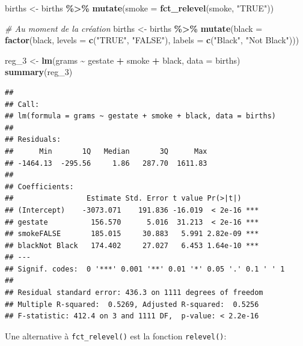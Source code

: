 \documentclass[
  11pt,
]{book}
\newenvironment{Shaded}{\begin{snugshade}}{\end{snugshade}}
\newcommand{\CommentTok}[1]{\textcolor[rgb]{0.56,0.35,0.01}{\textit{#1}}}
\newcommand{\DataTypeTok}[1]{\textcolor[rgb]{0.13,0.29,0.53}{#1}}
\newcommand{\DecValTok}[1]{\textcolor[rgb]{0.00,0.00,0.81}{#1}}
\newcommand{\KeywordTok}[1]{\textcolor[rgb]{0.13,0.29,0.53}{\textbf{#1}}}
\newcommand{\NormalTok}[1]{#1}
\newcommand{\OperatorTok}[1]{\textcolor[rgb]{0.81,0.36,0.00}{\textbf{#1}}}
\newcommand{\StringTok}[1]{\textcolor[rgb]{0.31,0.60,0.02}{#1}}
\numberwithin{equation}{section}
\numberwithin{countremarque}{section}
\begin{document}
\begin{Shaded}
\begin{Highlighting}[]
\NormalTok{births \textless{}{-}}\StringTok{ }
\StringTok{  }\NormalTok{births }\OperatorTok{\%\textgreater{}\%}\StringTok{ }
\StringTok{  }\KeywordTok{mutate}\NormalTok{(}\DataTypeTok{smoke =} \KeywordTok{fct\_relevel}\NormalTok{(smoke, }\StringTok{"TRUE"}\NormalTok{))}

\CommentTok{\# Au moment de la création}
\NormalTok{births \textless{}{-}}\StringTok{ }
\StringTok{  }\NormalTok{births }\OperatorTok{\%\textgreater{}\%}\StringTok{ }
\StringTok{  }\KeywordTok{mutate}\NormalTok{(}\DataTypeTok{black =} \KeywordTok{factor}\NormalTok{(black, }\DataTypeTok{levels =} \KeywordTok{c}\NormalTok{(}\StringTok{"TRUE"}\NormalTok{, }\StringTok{"FALSE"}\NormalTok{),}
                        \DataTypeTok{labels =} \KeywordTok{c}\NormalTok{(}\StringTok{"Black"}\NormalTok{, }\StringTok{"Not Black"}\NormalTok{)))}

\NormalTok{reg\_}\DecValTok{3}\NormalTok{ \textless{}{-}}\StringTok{ }\KeywordTok{lm}\NormalTok{(grams }\OperatorTok{\textasciitilde{}}\StringTok{ }\NormalTok{gestate }\OperatorTok{+}\StringTok{ }\NormalTok{smoke }\OperatorTok{+}\StringTok{ }\NormalTok{black, }\DataTypeTok{data =}\NormalTok{ births)}
\KeywordTok{summary}\NormalTok{(reg\_}\DecValTok{3}\NormalTok{)}
\end{Highlighting}
\end{Shaded}

\begin{lstlisting}
## 
## Call:
## lm(formula = grams ~ gestate + smoke + black, data = births)
## 
## Residuals:
##      Min       1Q   Median       3Q      Max 
## -1464.13  -295.56     1.86   287.70  1611.83 
## 
## Coefficients:
##                 Estimate Std. Error t value Pr(>|t|)    
## (Intercept)    -3073.071    191.836 -16.019  < 2e-16 ***
## gestate          156.570      5.016  31.213  < 2e-16 ***
## smokeFALSE       185.015     30.883   5.991 2.82e-09 ***
## blackNot Black   174.402     27.027   6.453 1.64e-10 ***
## ---
## Signif. codes:  0 '***' 0.001 '**' 0.01 '*' 0.05 '.' 0.1 ' ' 1
## 
## Residual standard error: 436.3 on 1111 degrees of freedom
## Multiple R-squared:  0.5269, Adjusted R-squared:  0.5256 
## F-statistic: 412.4 on 3 and 1111 DF,  p-value: < 2.2e-16
\end{lstlisting}

Une alternative à \texttt{fct\_relevel()} est la fonction \texttt{relevel()}:

\begin{Shaded}
\end{Shaded}
\end{document}
